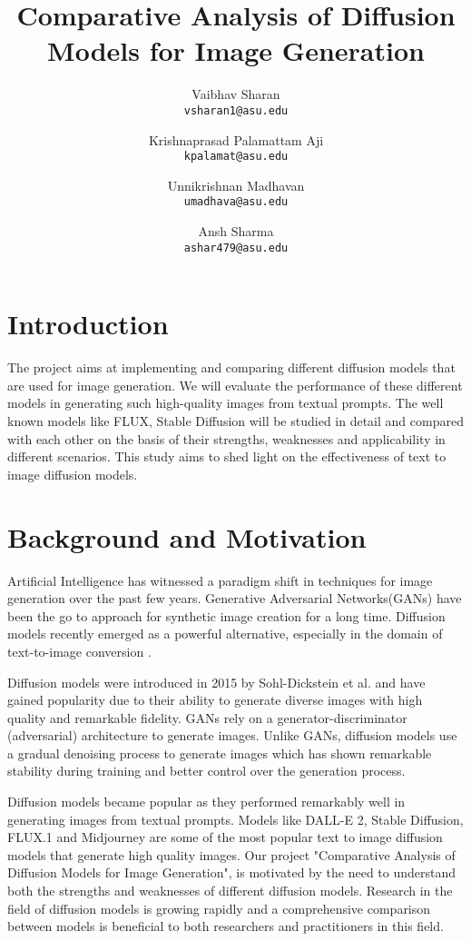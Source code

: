\documentclass{article}
\title{Comparative Analysis of Diffusion Models for Image Generation
}
\author{
  Vaibhav Sharan\\
  \texttt{vsharan1@asu.edu} \\ 
  \and
  Krishnaprasad Palamattam Aji\\
  \texttt{kpalamat@asu.edu}\\
  \and
  Unnikrishnan Madhavan\\
  \texttt{umadhava@asu.edu}\\
  \and
  Ansh Sharma\\
  \texttt{ashar479@asu.edu}
}
\begin{document}
\maketitle


\section{Introduction}
The project aims at implementing and comparing different diffusion models that are used for 
image generation. We will evaluate the performance of these different models in generating
such high-quality images from textual prompts. The well known models like FLUX, Stable
Diffusion will be studied in detail and compared with each other on the basis of
their strengths, weaknesses and applicability in different scenarios. This study aims to shed light
on the effectiveness of text to image diffusion models.


\section{Background and Motivation}
Artificial Intelligence has witnessed a paradigm shift in techniques for image generation over the past few years. 
Generative Adversarial Networks(GANs) have been the go to approach for synthetic image creation for a long time. 
Diffusion models recently emerged as a powerful alternative, especially in the domain of text-to-image conversion \cite{dhariwal2021}. 

Diffusion models were introduced in 2015 by Sohl-Dickstein et al.\cite{sohl2015} and have gained popularity 
due to their ability to generate diverse images with high quality and remarkable fidelity. GANs rely on a 
generator-discriminator (adversarial) architecture to generate images. Unlike GANs, diffusion models use a 
gradual denoising process to generate images which has shown remarkable stability during training and better control
over the generation process.

Diffusion models became popular as they performed remarkably well in generating images from textual prompts. Models like DALL-E 2,
Stable Diffusion, FLUX.1 and Midjourney are some of the most popular text to image diffusion models that generate high quality images. 
Our project "Comparative Analysis of Diffusion Models for Image Generation", is motivated by the 
need to understand both the strengths and weaknesses of different diffusion models. Research in the field of diffusion models 
is growing rapidly and a comprehensive comparison between models is beneficial to both researchers and practitioners in this field.
\end{document}
